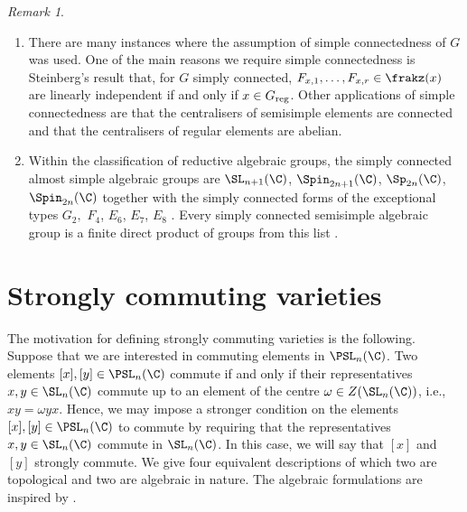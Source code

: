 \documentclass[12pt, a4paper, oneside]{amsart}
\theoremstyle{plain} %
\theoremstyle{definition} %
\theoremstyle{remark} %
\newtheorem{remark}[theorem]{Remark}
\begin{document}
\begin{remark}
\begin{enumerate}
\item There are many instances where the assumption of simple connectedness of $G$ was used. One of the main reasons we require simple connectedness is Steinberg's result that, for $G$ simply connected, $F_{x,1},\dots,F_{x,r}\in \frakz(x)$ are linearly independent if and only if $x\in G_{\rm reg}$. Other applications of simple connectedness are that the centralisers of semisimple elements are connected and that the centralisers of regular elements are abelian. 
\item Within the classification of reductive algebraic groups, the simply connected almost simple algebraic groups are $\SL_{n+1}(\C)$, $\Spin_{2n+1}(\C)$, $\Sp_{2n}(\C)$, $\Spin_{2n}(\C)$ together with the simply connected forms of the exceptional types $G_2,$ $F_4$, $E_6$, $E_7$, $E_8$ \cite[Table~9.2, p.~72]{MT11}. Every simply connected semisimple algebraic group is a finite direct product of groups from this list \cite[\S 24a]{Mil17}.
\end{enumerate}
\end{remark}

\section{Strongly commuting varieties}\label{c:stronglycommutingvarieties}
The motivation for defining strongly commuting varieties is the following. Suppose that we are interested in commuting elements in $\PSL_n(\C)$. Two elements $[x],[y]\in \PSL_n(\C)$ commute if and only if their representatives $x,y\in \SL_n(\C)$ commute up to an element of the centre $\omega\in Z(\SL_n(\C))$, i.e., $xy=\omega yx.$
Hence, we may impose a stronger condition on the elements $[x],[y]\in \PSL_n(\C)$ to commute by requiring that the representatives $x,y\in \SL_n(\C)$ commute in $\SL_n(\C)$. In this case, we will say that $[x]$ and $[y]$ strongly commute. We give four equivalent descriptions of which two are topological and two are algebraic in nature. The algebraic formulations are inspired by \cite[Section 3]{Ric79}.
\end{document}
